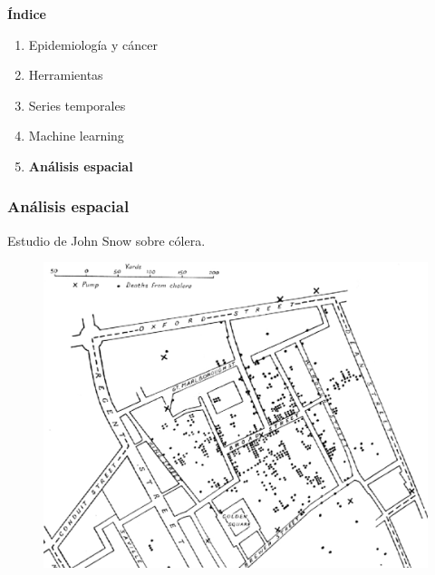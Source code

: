 \documentclass{beamer}
\begin{document}
\begin{frame}\frametitle{}
	\Large{\textbf{Índice}}\\[2ex]
	\normalsize
	\begin{enumerate}
		\item Epidemiología y cáncer\\[2ex]
		\item Herramientas\\[2ex]
		\item Series temporales \\[2ex]
		\item Machine learning \\[2ex]
		\item \textbf{Análisis espacial} \\[2ex]
	\end{enumerate}
\end{frame}


\begin{frame}\frametitle{Análisis espacial}
	\centering Estudio de John Snow sobre cólera.
	\begin{figure}
		\centering
		\includegraphics[width=.75\textwidth]{images/mapa_3.png}
	\end{figure}
\end{frame}

\end{document}
